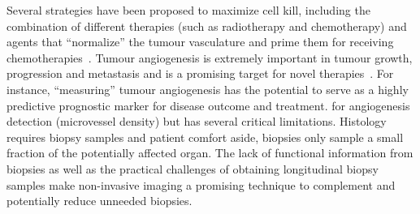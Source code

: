 Several strategies have been proposed to maximize cell kill, including the combination of different therapies (such as radiotherapy and chemotherapy) and agents that ``normalize'' the tumour vasculature and prime them for receiving chemotherapies~\cite{Jain:2005gk}.
Tumour angiogenesis is extremely important in tumour growth, progression and metastasis and is a promising target for novel therapies~\cite{Miles:2000wq}.
For instance, ``measuring'' tumour angiogenesis has the potential to serve as a highly predictive prognostic marker for disease outcome and treatment.
 for angiogenesis detection (microvessel density) but has several critical limitations.
Histology requires biopsy samples and patient comfort aside, biopsies only sample a small fraction of the potentially affected organ.
The lack of functional information from biopsies as well as the practical challenges of obtaining longitudinal biopsy samples make non-invasive imaging a promising technique to complement and potentially reduce unneeded biopsies.

